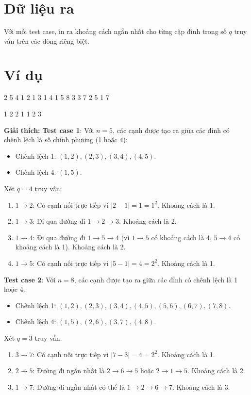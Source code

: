 \documentclass[11pt]{article}
\newcommand{\explanation}[1]{
    \vspace{0.5cm}
    \noindent \textbf{Giải thích:} #1
}
\begin{document}
\section*{Dữ liệu ra}
Với mỗi test case, in ra khoảng cách ngắn nhất cho từng cặp đỉnh trong số $q$ truy vấn trên các dòng riêng biệt.

\section*{Ví dụ}
\begin{inputbox}
2
5 4
1 2
1 3
1 4
1 5
8 3
3 7
2 5
1 7
\end{inputbox}
\begin{outputbox}
1
2
2
1
1
2
3
\end{outputbox}

\explanation

\textbf{Test case 1}: Với $n = 5$, các cạnh được tạo ra giữa các đỉnh có chênh lệch là số chính phương (1 hoặc 4):
\begin{itemize}
    \item Chênh lệch 1: $(1, 2), (2, 3), (3, 4), (4, 5)$.
    \item Chênh lệch 4: $(1, 5)$.
\end{itemize}
Xét $q=4$ truy vấn:
\begin{enumerate}
    \item $1 \to 2$: Có cạnh nối trực tiếp vì $|2 - 1| = 1 = 1^2$. Khoảng cách là 1.
    \item $1 \to 3$: Đi qua đường đi $1 \to 2 \to 3$. Khoảng cách là 2.
    \item $1 \to 4$: Đi qua đường đi $1 \to 5 \to 4$ (vì $1 \to 5$ có khoảng cách là 4, $5 \to 4$ có khoảng cách là 1). Khoảng cách là 2.
    \item $1 \to 5$: Có cạnh nối trực tiếp vì $|5 - 1| = 4 = 2^2$. Khoảng cách là 1.
\end{enumerate}

\textbf{Test case 2}: Với $n = 8$, các cạnh được tạo ra giữa các đỉnh có chênh lệch là 1 hoặc 4:
\begin{itemize}
    \item Chênh lệch 1: $(1, 2), (2, 3), (3, 4), (4, 5), (5, 6), (6, 7), (7, 8)$.
    \item Chênh lệch 4: $(1, 5), (2, 6), (3, 7), (4, 8)$.
\end{itemize}
Xét $q=3$ truy vấn:
\begin{enumerate}
    \item $3 \to 7$: Có cạnh nối trực tiếp vì $|7 - 3| = 4 = 2^2$. Khoảng cách là 1.
    \item $2 \to 5$: Đường đi ngắn nhất là $2 \to 6 \to 5$ hoặc $2 \to 1 \to 5$. Khoảng cách là 2.
    \item $1 \to 7$: Đường đi ngắn nhất có thể là $1 \to 2 \to 6 \to 7$. Khoảng cách là 3.
\end{enumerate}

\newpage
\end{document}
